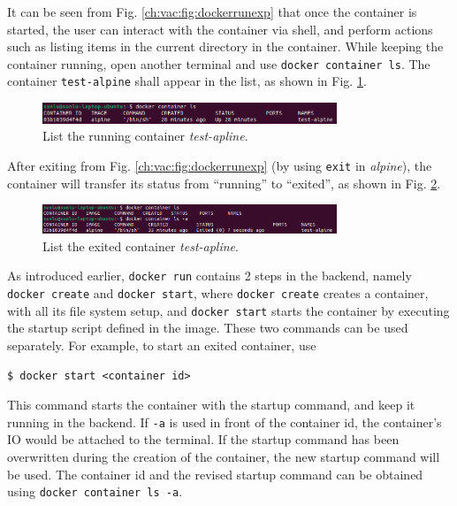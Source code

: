 It can be seen from Fig. \ref{ch:vac:fig:dockerrunexp} that once the container is started, the user can interact with the container via shell, and perform actions such as listing items in the current directory in the container. While keeping the container running, open another terminal and use \verb|docker container ls|. The container \verb|test-alpine| shall appear in the list, as shown in Fig. \ref{ch:vac:fig:dockerrunexppart2}.
\begin{figure}
	\centering
	\includegraphics[width=250pt]{chapters/ch-virtualization-and-containerization/figures/dockerrunexppart2.png}
	\caption{List the running container \textit{test-apline}.} \label{ch:vac:fig:dockerrunexppart2}
\end{figure}
After exiting from Fig. \ref{ch:vac:fig:dockerrunexp} (by using \verb|exit| in \textit{alpine}), the container will transfer its status from ``running'' to ``exited'', as shown in Fig. \ref{ch:vac:fig:dockerrunexppart3}.
\begin{figure}
	\centering
	\includegraphics[width=250pt]{chapters/ch-virtualization-and-containerization/figures/dockerrunexppart3.png}
	\caption{List the exited container \textit{test-apline}.} \label{ch:vac:fig:dockerrunexppart3}
\end{figure}

As introduced earlier, \verb|docker run| contains 2 steps in the backend, namely \verb|docker create| and \verb|docker start|, where \verb|docker create| creates a container, with all its file system setup, and \verb|docker start| starts the container by executing the startup script defined in the image. These two commands can be used separately. For example, to start an exited container, use
\begin{lstlisting}
$ docker start <container id>
\end{lstlisting}
This command starts the container with the startup command, and keep it running in the backend. If \verb|-a| is used in front of the container id, the container's IO would be attached to the terminal. If the startup command has been overwritten during the creation of the container, the new startup command will be used. The container id and the revised startup command can be obtained using \verb|docker container ls -a|.

